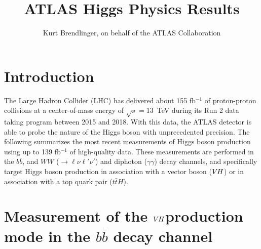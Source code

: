 \documentclass{moriond}
\def\vh{\texorpdfstring{\ensuremath{V\kern -0.1em H}\xspace}{VH\xspace}}
\begin{document}
\linenumbers

\vspace*{4cm}
\title{ATLAS Higgs Physics Results}

\author{ Kurt Brendlinger, on behalf of the ATLAS Collaboration }

\address{~\\DESY, Notkestra\ss e 85,\\ 22607 Hamburg, Germany}

\maketitle{}

\section{Introduction}

The Large Hadron Collider (LHC) \cite{Evans:2008zzb} has delivered about 155 fb$^{-1}$ of proton-proton
collisions at a center-of-mass energy of $\sqrt{s}=13$~TeV during its Run 2 data taking program
between 2015 and 2018.
With this data, the
ATLAS detector \cite{PERF-2007-01,ATLAS-TDR-19} is able to probe the nature of the Higgs boson with unprecedented
precision. The following summarizes the most recent measurements of Higgs boson production using up
to 139 fb$^{-1}$ of high-quality data. These measurements are performed in the $b\bar b$,
and $WW$ (${\rightarrow}\ell\nu\ell'\nu'$) and diphoton ($\gamma\gamma$) decay channels, and specifically
target Higgs boson production in association with a vector boson (\vh) or in association with a top
quark pair ($t\bar tH$).

\section{Measurement of the \vh production mode in the $b\bar b$ decay channel}\label{sec:vh_bb}
\end{document}
